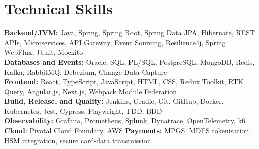 \documentclass[a4paper,10pt]{article}
\begin{document}
\section{Technical Skills}
\textbf{Backend/JVM:} Java, Spring, Spring Boot, Spring Data JPA, Hibernate, REST APIs, Microservices, API Gateway, Event Sourcing, Resilience4j, Spring WebFlux, JUnit, Mockito\\
\textbf{Databases and Events:} Oracle, SQL, PL/SQL, PostgreSQL, MongoDB, Redis, Kafka, RabbitMQ, Debezium, Change Data Capture\\
\textbf{Frontend:} React, TypeScript, JavaScript, HTML, CSS, Redux Toolkit, RTK Query, Angular.js, Next.js, Webpack Module Federation\\
\textbf{Build, Release, and Quality:} Jenkins, Gradle, Git, GitHub, Docker, Kubernetes, Jest, Cypress, Playwright, TDD, BDD\\
\textbf{Observability:} Grafana, Prometheus, Splunk, Dynatrace, OpenTelemetry, k6 \\
\textbf{Cloud}: Pivotal Cloud Foundary, AWS
\textbf{Payments:} MPGS, MDES tokenisation, HSM integration, secure card-data transmission
\end{document}
